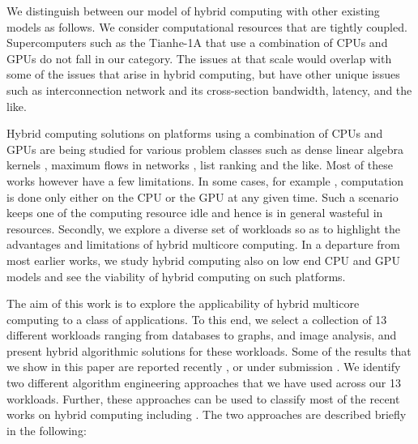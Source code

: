 \documentclass[11pt]{article}
\newcommand{\ignore}[1] {}
\begin{document}
We distinguish between our model of hybrid computing with other existing
models as follows. We consider computational resources that are tightly
coupled. Supercomputers such as the Tianhe-1A that
use a combination of CPUs and GPUs do not fall in our category. The
issues at that scale would overlap with some of the issues that arise in
hybrid computing, but have other unique issues such as interconnection
network and its cross-section bandwidth, latency,  and the like. 

\ignore {
Hybrid computing brings its own set of challenges
to algorithm design, algorithm engineering, analysis, optimization,
and other system related challenges. Some of the challenging
issues that are relevant to hybrid computing are:

\begin{itemize}
\item Designing hybrid algorithms that are efficient, scalable,
and resource-friendly,
\item Implement, test correctness, reason about, and debug
hybrid solutions
\item Analyse hybrid algorithms, and 
\item Characterization of problems that allow for efficient hybrid
algorithms? 
\end{itemize}
}

Hybrid computing solutions on platforms using a combination of CPUs and GPUs
are being studied for various problem classes such as dense linear algebra
kernels \cite{BDT08, dongarra2009}, maximum flows in networks \cite{hong09},
list ranking \cite{WJ10} and the like. 
Most of these works however have a few limitations. In some cases,
for example \cite{hong09,WJ10, SMI12}, computation is done only
either on the CPU or the GPU at any given time. Such a scenario keeps one
of the computing resource idle and hence is in general wasteful in
resources. Secondly, we explore a diverse set of workloads so as to
highlight the advantages and limitations of hybrid multicore computing.
In a departure from most earlier works, we study hybrid computing also on
low end CPU and GPU models and see the viability of hybrid computing on
such platforms.


The aim of this work is to explore the applicability of hybrid
multicore computing to a class of applications. To this end, we
select a collection of 13 different workloads ranging from databases
to graphs, and image analysis, and present hybrid algorithmic
solutions for these workloads. Some of the results that we show in this
paper are reported recently \cite{lspp12,hipc11,hipc11pjn,bundle,sgemm}, or
under submission \cite{newsort}.  We 
identify two different algorithm engineering approaches that we
have used across our 13 workloads. Further, these approaches can be 
used to classify most of the recent works on hybrid computing
including \cite{dongarra2009, AICCSA11}. The two
approaches are described briefly in the following:
\end{document}
